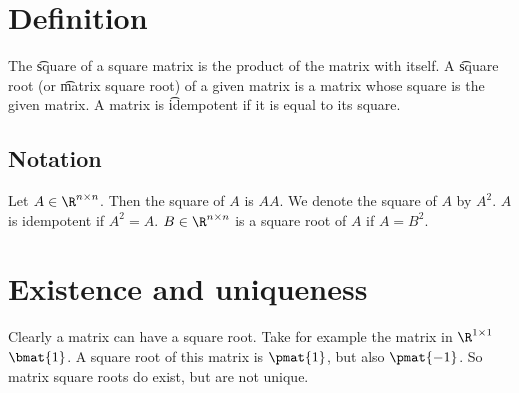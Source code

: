 
\section*{Definition}

The \t{square} of a square matrix is the product of the matrix with itself.
A \t{square root} (or \t{matrix square root}) of a given matrix is a matrix whose square is the given matrix.
A matrix is \t{idempotent} if it is equal to its square.

\subsection*{Notation}

Let $A \in \R ^{n \times  n}$.
Then the square of $A$ is $AA$.
We denote the square of $A$ by $A^2$.
$A$ is idempotent if $A^2 = A$.
$B \in \R ^{n \times  n}$ is a square root of $A$ if $A = B^2$.

\section*{Existence and uniqueness}

Clearly a matrix can have a square root.
Take for example the matrix in $\R ^{1 \times  1}$ $\bmat{1}$.
A square root of this matrix is $\pmat{1}$, but also $\pmat{-1}$.
So matrix square roots do exist, but are not unique.

\blankpage